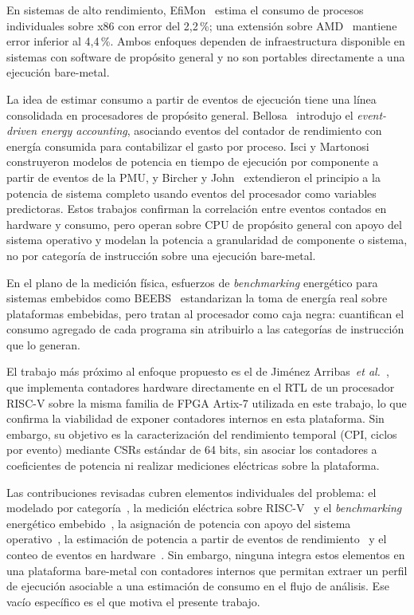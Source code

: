 En sistemas de alto rendimiento, EfiMon~\cite{leonvega2024efimon} estima el
consumo de procesos individuales sobre x86 con error del 2{,}2\,\%; una extensión sobre
AMD~\cite{leonvega2024carla} mantiene error inferior al 4{,}4\,\%. Ambos
enfoques dependen de infraestructura disponible en sistemas con software de
propósito general y no son portables directamente a una ejecución bare-metal.

La idea de estimar consumo a partir de eventos de ejecución tiene una línea
consolidada en procesadores de propósito general. Bellosa~\cite{bellosa2000eventdriven}
introdujo el \emph{event-driven energy accounting}, asociando eventos del
contador de rendimiento con energía consumida para contabilizar el gasto por
proceso. Isci y Martonosi~\cite{isci2003runtime} construyeron modelos de
potencia en tiempo de ejecución por componente a partir de eventos de la PMU,
y Bircher y John~\cite{bircher2012complete} extendieron el principio a la
potencia de sistema completo usando eventos del procesador como variables
predictoras. Estos trabajos confirman la correlación entre eventos contados en
hardware y consumo, pero operan sobre CPU de propósito general con apoyo del
sistema operativo y modelan la potencia a granularidad de componente o sistema,
no por categoría de instrucción sobre una ejecución bare-metal.

En el plano de la medición física, esfuerzos de \emph{benchmarking} energético
para sistemas embebidos como BEEBS~\cite{pallister2013beebs} estandarizan la
toma de energía real sobre plataformas embebidas, pero tratan al procesador como
caja negra: cuantifican el consumo agregado de cada programa sin atribuirlo a
las categorías de instrucción que lo generan.

El trabajo más próximo al enfoque propuesto es el de Jiménez Arribas~\emph{et
al.}~\cite{jimenez2024hpm}, que implementa contadores hardware directamente en
el RTL de un procesador RISC-V sobre la misma familia de FPGA Artix-7 utilizada
en este trabajo, lo que confirma la viabilidad de exponer contadores internos
en esta plataforma. Sin embargo, su objetivo es la caracterización del rendimiento
temporal (CPI, ciclos por evento) mediante CSRs estándar de 64 bits, sin asociar
los contadores a coeficientes de potencia ni realizar mediciones eléctricas
sobre la plataforma.

Las contribuciones revisadas cubren elementos individuales del problema: el
modelado por categoría~\cite{tiwari1994power, fang2021instruction}, la medición
eléctrica sobre RISC-V~\cite{fang2021instruction} y el \emph{benchmarking}
energético embebido~\cite{pallister2013beebs}, la asignación de potencia con
apoyo del sistema operativo~\cite{leonvega2024efimon, leonvega2024carla}, la
estimación de potencia a partir de eventos de
rendimiento~\cite{bellosa2000eventdriven, isci2003runtime, bircher2012complete}
y el conteo de eventos en hardware~\cite{jimenez2024hpm}. Sin embargo, ninguna
integra estos elementos en una plataforma bare-metal con contadores internos que
permitan extraer un perfil de ejecución asociable a una estimación de consumo
en el flujo de análisis. Ese vacío específico es el que motiva el presente
trabajo.
